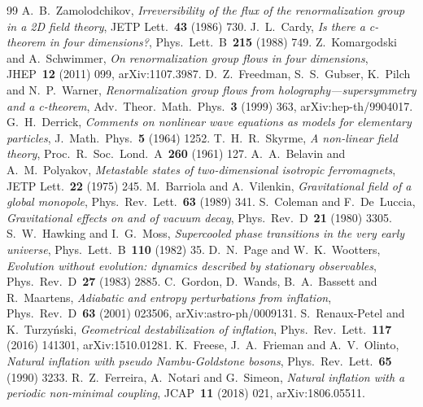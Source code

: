 \documentclass[11pt]{article}
\theoremstyle{definition}
\begin{document}
\renewcommand{\refname}{R\'ef\'erences}
\begin{thebibliography}{99}\small
{} A.~B.~Zamolodchikov, \emph{Irreversibility of the flux of the renormalization group in a 2D field theory}, JETP Lett.~\textbf{43} (1986) 730.
 J.~L.~Cardy, \emph{Is there a c-theorem in four dimensions?}, Phys.\ Lett.\ B~\textbf{215} (1988) 749.
 Z.~Komargodski and A.~Schwimmer, \emph{On renormalization group flows in four dimensions}, JHEP~\textbf{12} (2011) 099, arXiv:1107.3987.
 D.~Z.~Freedman, S.~S.~Gubser, K.~Pilch and N.~P.~Warner, \emph{Renormalization group flows from holography---supersymmetry and a c-theorem}, Adv.\ Theor.\ Math.\ Phys.~\textbf{3} (1999) 363, arXiv:hep-th/9904017.
 G.~H.~Derrick, \emph{Comments on nonlinear wave equations as models for elementary particles}, J.\ Math.\ Phys.~\textbf{5} (1964) 1252.
 T.~H.~R.~Skyrme, \emph{A non-linear field theory}, Proc.\ R.\ Soc.\ Lond.\ A~\textbf{260} (1961) 127.
 A.~A.~Belavin and A.~M.~Polyakov, \emph{Metastable states of two-dimensional isotropic ferromagnets}, JETP Lett.~\textbf{22} (1975) 245.
 M.~Barriola and A.~Vilenkin, \emph{Gravitational field of a global monopole}, Phys.\ Rev.\ Lett.~\textbf{63} (1989) 341.
 S.~Coleman and F.~De~Luccia, \emph{Gravitational effects on and of vacuum decay}, Phys.\ Rev.\ D~\textbf{21} (1980) 3305.
 S.~W.~Hawking and I.~G.~Moss, \emph{Supercooled phase transitions in the very early universe}, Phys.\ Lett.\ B~\textbf{110} (1982) 35.
 D.~N.~Page and W.~K.~Wootters, \emph{Evolution without evolution: dynamics described by stationary observables}, Phys.\ Rev.\ D~\textbf{27} (1983) 2885.
 C.~Gordon, D.~Wands, B.~A.~Bassett and R.~Maartens, \emph{Adiabatic and entropy perturbations from inflation}, Phys.\ Rev.\ D~\textbf{63} (2001) 023506, arXiv:astro-ph/0009131.
 S.~Renaux-Petel and K.~Turzy\'nski, \emph{Geometrical destabilization of inflation}, Phys.\ Rev.\ Lett.~\textbf{117} (2016) 141301, arXiv:1510.01281.
 K.~Freese, J.~A.~Frieman and A.~V.~Olinto, \emph{Natural inflation with pseudo Nambu-Goldstone bosons}, Phys.\ Rev.\ Lett.~\textbf{65} (1990) 3233.
 R.~Z.~Ferreira, A.~Notari and G.~Simeon, \emph{Natural inflation with a periodic non-minimal coupling}, JCAP~\textbf{11} (2018) 021, arXiv:1806.05511.

\end{thebibliography}
\end{document}
